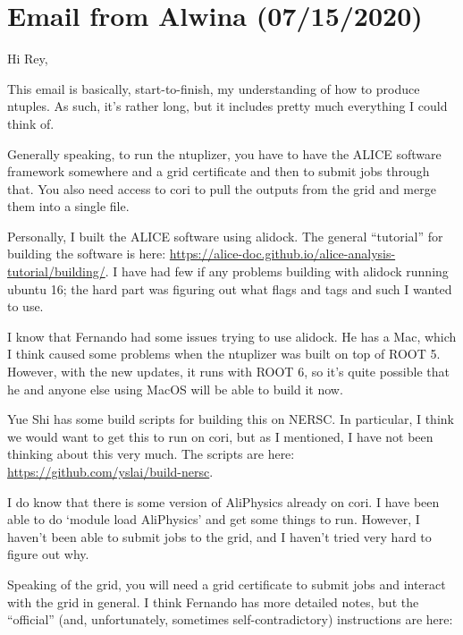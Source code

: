 \documentclass[12pt]{article}
\begin{document}
\newpage

\section{Email from Alwina (07/15/2020)}

Hi Rey,

This email is basically, start-to-finish, my understanding of how to produce ntuples. As such, it's rather long, but it includes pretty much everything I could think of.

Generally speaking, to run the ntuplizer, you have to have the ALICE software framework somewhere and a grid certificate and then to submit jobs through that. You also need access to cori to pull the outputs from the grid and merge them into a single file.

Personally, I built the ALICE software using alidock. The general ``tutorial'' for building the software is here: \href{https://alice-doc.github.io/alice-analysis-tutorial/building/}{https://alice-doc.github.io/alice-analysis-tutorial/building/}. I have had few if any problems building with alidock running ubuntu 16; the hard part was figuring out what flags and tags and such I wanted to use.

I know that Fernando had some issues trying to use alidock. He has a Mac, which I think caused some problems when the ntuplizer was built on top of ROOT 5. However, with the new updates, it runs with ROOT 6, so it's quite possible that he and anyone else using MacOS will be able to build it now.

Yue Shi has some build scripts for building this on NERSC. In particular, I think we would want to get this to run on cori, but as I mentioned, I have not been thinking about this very much. The scripts are here: \href{https://github.com/yslai/build-nersc}{https://github.com/yslai/build-nersc}.

I do know that there is some version of AliPhysics already on cori. I have been able to do `module load AliPhysics' and get some things to run. However, I haven't been able to submit jobs to the grid, and I haven't tried very hard to figure out why.

Speaking of the grid, you will need a grid certificate to submit jobs and interact with the grid in general. I think Fernando has more detailed notes, but the ``official'' (and, unfortunately, sometimes self-contradictory) instructions are here:
\end{document}

